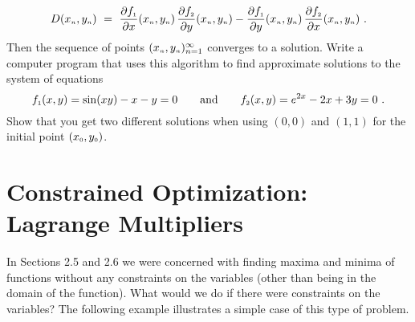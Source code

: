 \begin{enumerate}[\bfseries 1.]
\begin{gather*}
    D(x_{\scriptscriptstyle n},y_{\scriptscriptstyle n}) ~=~ \frac{\partial f_{\scriptscriptstyle 1}}{\partial x}(x_{\scriptscriptstyle n},y_{\scriptscriptstyle n})\,
    \frac{\partial f_{\scriptscriptstyle 2}}{\partial y}(x_{\scriptscriptstyle n},y_{\scriptscriptstyle n}) -
    \frac{\partial f_{\scriptscriptstyle 1}}{\partial y}(x_{\scriptscriptstyle n},y_{\scriptscriptstyle n})\,
    \frac{\partial f_{\scriptscriptstyle 2}}{\partial x}(x_{\scriptscriptstyle n},y_{\scriptscriptstyle n}) ~.
  \end{gather*}
  Then the sequence of points $(x_{\scriptscriptstyle n},y_{\scriptscriptstyle n})_{n=1}^{\infty}$ converges to a solution. Write a computer
  program that uses this algorithm to find approximate solutions to the system of equations
  \begin{displaymath}
   f_{\scriptscriptstyle 1}(x,y) = \sin(xy)-x-y=0 \qquad\text{and}\qquad f_{\scriptscriptstyle 2}(x,y) = e^{2x}-2x+3y=0 ~.
  \end{displaymath}
  Show that you get two different solutions when using $(0,0)$ and $(1,1)$ for the initial point
  $(x_{\scriptscriptstyle 0},y_{\scriptscriptstyle 0})$.
\end{enumerate}
\newpage
\section{Constrained Optimization: Lagrange Multipliers}
In Sections 2.5 and 2.6 we were concerned with finding maxima and minima of functions without any constraints on
the variables (other than being in the domain of the function). What would we do if there were constraints on the
variables? The following example illustrates a simple case of this type of problem.

